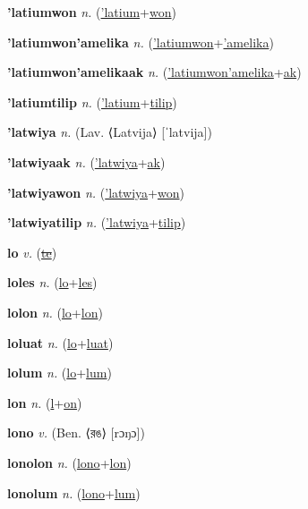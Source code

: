 \textbf{\hypertarget{'latiumwon}{'latiumwon}} \textit{n.} (\hyperlink{'latium}{'latium}+\allowbreak \hyperlink{won}{won})


\textbf{\hypertarget{'latiumwon'amelika}{'latiumwon'amelika}} \textit{n.} (\hyperlink{'latiumwon}{'latiumwon}+\allowbreak \hyperlink{'amelika}{'amelika})


\textbf{\hypertarget{'latiumwon'amelikaak}{'latiumwon'amelikaak}} \textit{n.} (\hyperlink{'latiumwon'amelika}{'latiumwon'amelika}+\allowbreak \hyperlink{ak}{ak})


\textbf{\hypertarget{'latiumtilip}{'latiumtilip}} \textit{n.} (\hyperlink{'latium}{'latium}+\allowbreak \hyperlink{tilip}{tilip})


\textbf{\hypertarget{'latwiya}{'latwiya}} \textit{n.} (Lav. ⟨Latvija⟩ [ˈlatvija])


\textbf{\hypertarget{'latwiyaak}{'latwiyaak}} \textit{n.} (\hyperlink{'latwiya}{'latwiya}+\allowbreak \hyperlink{ak}{ak})


\textbf{\hypertarget{'latwiyawon}{'latwiyawon}} \textit{n.} (\hyperlink{'latwiya}{'latwiya}+\allowbreak \hyperlink{won}{won})


\textbf{\hypertarget{'latwiyatilip}{'latwiyatilip}} \textit{n.} (\hyperlink{'latwiya}{'latwiya}+\allowbreak \hyperlink{tilip}{tilip})


\textbf{\hypertarget{lo}{lo}} \textit{v.} (\hyperlink{te}{\sout{te}})


\textbf{\hypertarget{loles}{loles}} \textit{n.} (\hyperlink{lo}{lo}+\allowbreak \hyperlink{les}{les})


\textbf{\hypertarget{lolon}{lolon}} \textit{n.} (\hyperlink{lo}{lo}+\allowbreak \hyperlink{lon}{lon})


\textbf{\hypertarget{loluat}{loluat}} \textit{n.} (\hyperlink{lo}{lo}+\allowbreak \hyperlink{luat}{luat})


\textbf{\hypertarget{lolum}{lolum}} \textit{n.} (\hyperlink{lo}{lo}+\allowbreak \hyperlink{lum}{lum})


\textbf{\hypertarget{lon}{lon}} \textit{n.} (\hyperlink{l}{l}+\allowbreak \hyperlink{on}{on})


\textbf{\hypertarget{lono}{lono}} \textit{v.} (Ben. ⟨{\bengali{}রঙ}⟩ [rɔŋɔ])


\textbf{\hypertarget{lonolon}{lonolon}} \textit{n.} (\hyperlink{lono}{lono}+\allowbreak \hyperlink{lon}{lon})


\textbf{\hypertarget{lonolum}{lonolum}} \textit{n.} (\hyperlink{lono}{lono}+\allowbreak \hyperlink{lum}{lum})



